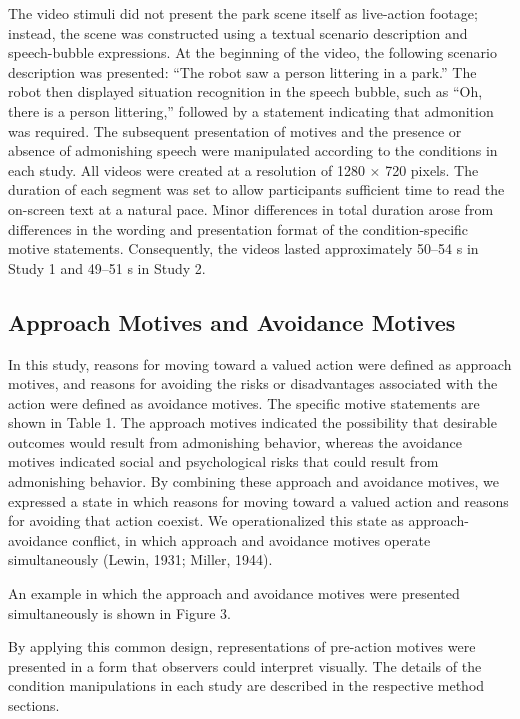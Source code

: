\documentclass[utf8]{FrontiersinHarvard}
\begin{document}
The video stimuli did not present the park scene itself as live-action footage; instead, the scene was constructed using a textual scenario description and speech-bubble expressions. At the beginning of the video, the following scenario description was presented: ``The robot saw a person littering in a park.'' The robot then displayed situation recognition in the speech bubble, such as ``Oh, there is a person littering,'' followed by a statement indicating that admonition was required. The subsequent presentation of motives and the presence or absence of admonishing speech were manipulated according to the conditions in each study. All videos were created at a resolution of 1280 $\times$ 720 pixels. The duration of each segment was set to allow participants sufficient time to read the on-screen text at a natural pace. Minor differences in total duration arose from differences in the wording and presentation format of the condition-specific motive statements. Consequently, the videos lasted approximately 50--54 s in Study 1 and 49--51 s in Study 2.

\subsection{Approach Motives and Avoidance Motives}\label{approach-motives-and-avoidance-motives}

In this study, reasons for moving toward a valued action were defined as approach motives, and reasons for avoiding the risks or disadvantages associated with the action were defined as avoidance motives. The specific motive statements are shown in Table 1. The approach motives indicated the possibility that desirable outcomes would result from admonishing behavior, whereas the avoidance motives indicated social and psychological risks that could result from admonishing behavior. By combining these approach and avoidance motives, we expressed a state in which reasons for moving toward a valued action and reasons for avoiding that action coexist. We operationalized this state as approach-avoidance conflict, in which approach and avoidance motives operate simultaneously (Lewin, 1931; Miller, 1944).

An example in which the approach and avoidance motives were presented simultaneously is shown in Figure 3.

By applying this common design, representations of pre-action motives were presented in a form that observers could interpret visually. The details of the condition manipulations in each study are described in the respective method sections.
\end{document}
